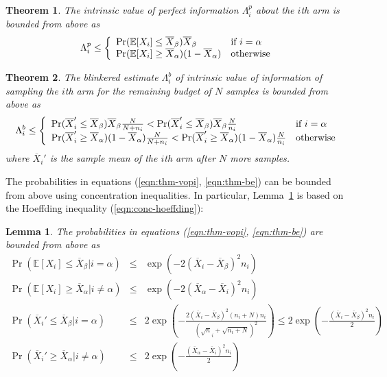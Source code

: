 \documentclass{article}
\newcommand {\IE} {\ensuremath {\mathbb{E}}}
\newtheorem{thm}{Theorem}
\newtheorem{lmm}{Lemma}
\begin{document}
\begin{thm} The intrinsic value of perfect information $\Lambda_i^p$ about the $i$th arm is
  bounded from above as
\begin{equation}
  \Lambda_i^p \le \left\{
  \begin{array}{l l}
    \Pr(\IE[X_i] \le \overline X_\beta)\overline X_\beta & \mbox{if $i=\alpha$} \\
    \Pr(\IE[X_i] \ge \overline X_\alpha)(1-\overline X_\alpha) & \mbox{otherwise}
  \end{array} \right.
\label{eqn:thm-vopi}
\end{equation}
\end{thm}

\begin{thm} The blinkered estimate $\Lambda_i^b$ of intrinsic value of information of sampling
  the $i$th arm for the remaining budget of $N$ samples is bounded from above as
\begin{equation}
  \Lambda_i^b \le \left\{
  \begin{array}{l l}
    \Pr(\overline X_i'\le\overline X_\beta)\overline X_\beta\frac N {N+n_i} < \Pr(\overline X_i'\le\overline X_\beta)\overline X_\beta\frac N   {n_i} & \mbox{if $i=\alpha$} \\
    \Pr(\overline X_i'\ge\overline X_\alpha)(1-\overline X_\alpha)\frac N {N+n_i} < \Pr(\overline X_i'\ge\overline X_\alpha)(1-\overline X_\alpha)\frac N {n_i}&  \mbox{otherwise}
  \end{array} \right.
\label{eqn:thm-be}
\end{equation}
where $\overline X_i'$ is the sample mean of the $i$th arm after $N$ more
samples.
\end{thm}

 The probabilities in equations (\ref{eqn:thm-vopi}, \ref{eqn:thm-be}) can be bounded from above using concentration
inequalities. In particular, Lemma~\ref{lemma:hoeffding-prob-bounds} is
based on the Hoeffding inequality (\ref{eqn:conc-hoeffding}):
\begin{lmm} The probabilities in equations (\ref{eqn:thm-vopi}, \ref{eqn:thm-be}) are bounded from above as
\begin{eqnarray}
\Pr(\IE[X_i] \le \overline X_\beta|i=\alpha)& \le & \exp(-2 (\overline X_i - \overline X_\beta)^2 n_i)\nonumber\\
\Pr(\IE[X_i] \ge \overline X_\alpha|i\ne\alpha)& \le & \exp(-2 (\overline X_\alpha - \overline X_i)^2 n_i)\nonumber\\
\Pr(\overline X_i' \le \overline X_\beta|i=\alpha)& \le &  2\exp\left(-\frac {2(\overline X_i - \overline X_\beta)^2  (n_i+N) n_i} {(\sqrt n_i + \sqrt {n_i + N})^2}  \right) \le 2\exp\left(-\frac {(\overline X_i - \overline X_\beta)^2 n_i} 2 \right)\nonumber\\
\Pr(\overline X_i' \ge \overline X_\alpha|i\ne\alpha)& \le & 2\exp\left(-\frac {(\overline X_\alpha - \overline X_i)^2 n_i} 2 \right)
\label{eqn:probound-perf-hoeffding}
\end{eqnarray}
\label{lemma:hoeffding-prob-bounds}
\end{lmm}
\end{document}

